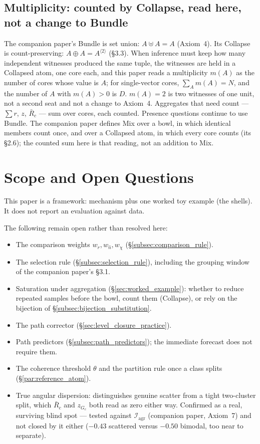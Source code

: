 \documentclass[12pt, a4paper]{article}
\begin{document}
\subsection{Multiplicity: counted by Collapse, read here, not a change to Bundle}
\label{subsec:multiplicity_reading}
The companion paper's Bundle is set union: $A\uplus A=A$ (Axiom~4). Its
Collapse is count-preserving: $A\oplus A=A^{\langle 2\rangle}$
(\S3.3). When inference must keep how many independent witnesses
produced the same tuple, the witnesses are held in a Collapsed atom,
one core each, and this paper reads a multiplicity $m(A)$ as the
number of cores whose value is $A$; for single-vector cores,
$\sum_A m(A)=N$, and the number of $A$ with $m(A)>0$ is $D$.
$m(A)=2$ is two witnesses of one unit, not a second seat and not a
change to Axiom~4. Aggregates that need count --- $\sum r$, $z$,
$\bar R_c$ --- sum over cores, each counted. Presence questions
continue to use Bundle. The companion paper defines Mix over a bowl, in
which identical members count once, and over a Collapsed atom, in which
every core counts (its \S2.6); the counted sum here is that reading, not
an addition to Mix.

\section{Scope and Open Questions}
\label{sec:scope}

This paper is a framework: mechanism plus one worked toy example
(the shells). It does not report an evaluation against data.

The following remain open rather than resolved here:

\begin{itemize}
\item The comparison weights $w_r,w_{\hat n},w_\chi$
      (\S\ref{subsec:comparison_rule}).
\item The selection rule (\S\ref{subsec:selection_rule}), including the grouping window of the companion paper's \S3.1.
\item Saturation under aggregation (\S\ref{sec:worked_example}):
      whether to reduce repeated samples before the bowl, count them (Collapse), or rely on the bijection of \S\ref{subsec:bijection_substitution}.
\item The path corrector (\S\ref{sec:level_closure_practice}).
\item Path predictors (\S\ref{subsec:path_predictors}); the immediate
      forecast does not require them.
\item The coherence threshold $\theta$ and the partition rule once a
      class splits (\S\ref{par:reference_atom}).
\item True angular dispersion: distinguishes genuine scatter from a
      tight two-cluster split, which $\bar R_c$ and $z_{G_c}$ both
      read as zero either way. Confirmed as a real, surviving blind
      spot --- tested against $\mathcal{I}_{\mathrm{agr}}$ (companion
      paper, Axiom~7) and not closed by it either ($-0.43$ scattered
      versus $-0.50$ bimodal, too near to separate).
\end{itemize}
\end{document}
